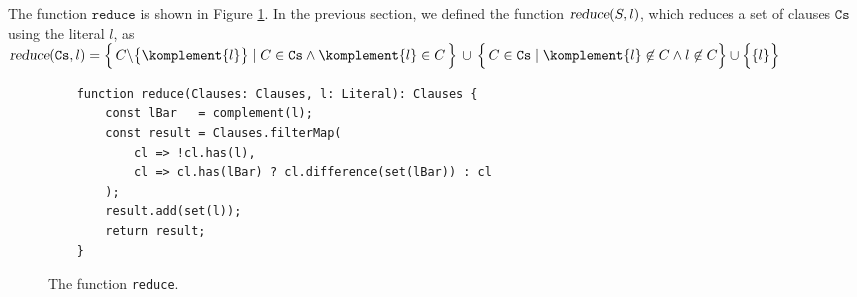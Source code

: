 The function $\texttt{reduce}$  is shown in Figure \ref{fig:reduce}.
In the previous section, we defined the function $\textsl{reduce}(S, l)$, which reduces a
set of clauses $\texttt{Cs}$ using the literal $l$, as
\\[0.2cm]
\hspace*{1.3cm}
$\textsl{reduce}(\texttt{Cs},l)  = 
 \Bigl\{\, C \backslash \bigl\{\komplement{l}\bigr\} \;|\; C \in \texttt{Cs} \wedge \komplement{l} \in C \,\Bigr\} 
       \,\cup\, \Bigl\{\, C \in \texttt{Cs} \mid \komplement{l} \not\in C \wedge l \not\in C \Bigr\} \cup \Bigl\{\{l\}\Bigr\}
$
\\[0.2cm]
\begin{figure}[!ht]
  \centering
\begin{verbatim}
    function reduce(Clauses: Clauses, l: Literal): Clauses {
        const lBar   = complement(l);
        const result = Clauses.filterMap(
            cl => !cl.has(l),
            cl => cl.has(lBar) ? cl.difference(set(lBar)) : cl
        );
        result.add(set(l));    
        return result;
    }
\end{verbatim}
\vspace*{-0.3cm}
  \caption{The function \texttt{reduce}. }
  \label{fig:reduce}
\end{figure} 
